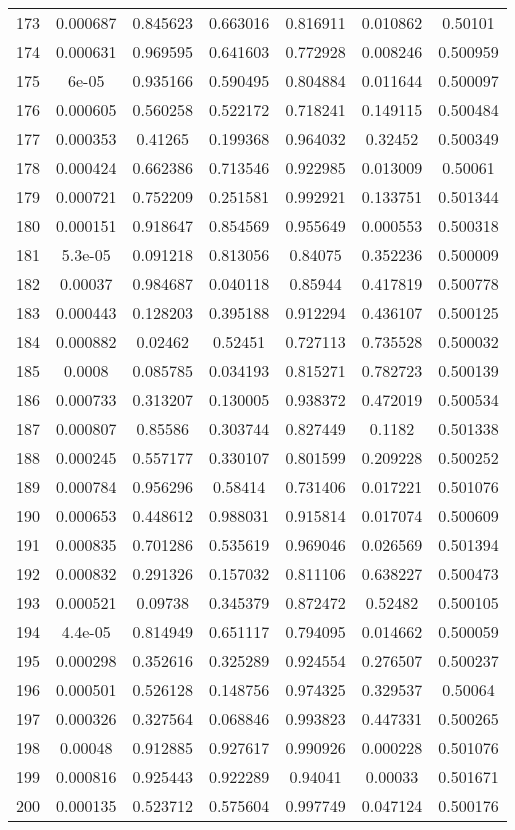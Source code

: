\begin{table}
\begin{tabular}{c|c|c|c|c|c|c}
173 & 0.000687 & 0.845623 & 0.663016 & 0.816911 & 0.010862 & 0.50101\\
174 & 0.000631 & 0.969595 & 0.641603 & 0.772928 & 0.008246 & 0.500959\\
175 & 6e-05 & 0.935166 & 0.590495 & 0.804884 & 0.011644 & 0.500097\\
176 & 0.000605 & 0.560258 & 0.522172 & 0.718241 & 0.149115 & 0.500484\\
177 & 0.000353 & 0.41265 & 0.199368 & 0.964032 & 0.32452 & 0.500349\\
178 & 0.000424 & 0.662386 & 0.713546 & 0.922985 & 0.013009 & 0.50061\\
179 & 0.000721 & 0.752209 & 0.251581 & 0.992921 & 0.133751 & 0.501344\\
180 & 0.000151 & 0.918647 & 0.854569 & 0.955649 & 0.000553 & 0.500318\\
181 & 5.3e-05 & 0.091218 & 0.813056 & 0.84075 & 0.352236 & 0.500009\\
182 & 0.00037 & 0.984687 & 0.040118 & 0.85944 & 0.417819 & 0.500778\\
183 & 0.000443 & 0.128203 & 0.395188 & 0.912294 & 0.436107 & 0.500125\\
184 & 0.000882 & 0.02462 & 0.52451 & 0.727113 & 0.735528 & 0.500032\\
185 & 0.0008 & 0.085785 & 0.034193 & 0.815271 & 0.782723 & 0.500139\\
186 & 0.000733 & 0.313207 & 0.130005 & 0.938372 & 0.472019 & 0.500534\\
187 & 0.000807 & 0.85586 & 0.303744 & 0.827449 & 0.1182 & 0.501338\\
188 & 0.000245 & 0.557177 & 0.330107 & 0.801599 & 0.209228 & 0.500252\\
189 & 0.000784 & 0.956296 & 0.58414 & 0.731406 & 0.017221 & 0.501076\\
190 & 0.000653 & 0.448612 & 0.988031 & 0.915814 & 0.017074 & 0.500609\\
191 & 0.000835 & 0.701286 & 0.535619 & 0.969046 & 0.026569 & 0.501394\\
192 & 0.000832 & 0.291326 & 0.157032 & 0.811106 & 0.638227 & 0.500473\\
193 & 0.000521 & 0.09738 & 0.345379 & 0.872472 & 0.52482 & 0.500105\\
194 & 4.4e-05 & 0.814949 & 0.651117 & 0.794095 & 0.014662 & 0.500059\\
195 & 0.000298 & 0.352616 & 0.325289 & 0.924554 & 0.276507 & 0.500237\\
196 & 0.000501 & 0.526128 & 0.148756 & 0.974325 & 0.329537 & 0.50064\\
197 & 0.000326 & 0.327564 & 0.068846 & 0.993823 & 0.447331 & 0.500265\\
198 & 0.00048 & 0.912885 & 0.927617 & 0.990926 & 0.000228 & 0.501076\\
199 & 0.000816 & 0.925443 & 0.922289 & 0.94041 & 0.00033 & 0.501671\\
200 & 0.000135 & 0.523712 & 0.575604 & 0.997749 & 0.047124 & 0.500176\\
\end{tabular}
\end{table}
